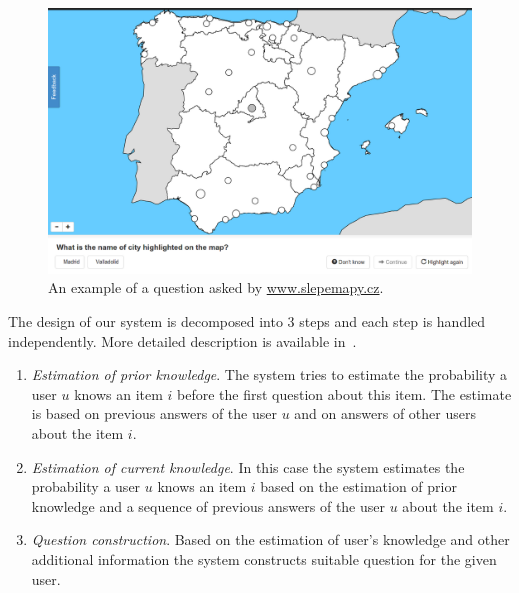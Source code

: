\documentclass[table,color]{fithesis3/fithesis3}
\begin{document}
\begin{figure}[h]
	\begin{center}
		\includegraphics[width=\textwidth]{figure/slepemapy_spain_highlighted}
		\caption{An example of a question asked by \url{www.slepemapy.cz}.}
		\label{figure:example_question}
	\end{center}
\end{figure}

The design of our system is decomposed into 3 steps and each step is handled
independently. More detailed description is available
in~\cite{papousek2014adaptive, papousek2015impact}.

\begin{enumerate}
	\item \emph{Estimation of prior knowledge}. The system tries to estimate the
		probability a user $u$ knows an item $i$ before the first question
		about this item. The estimate is based on previous answers of the user $u$
		and on answers of other users about the item $i$.
	\item \emph{Estimation of current knowledge}. In this case the system
		estimates the probability a user $u$ knows an item $i$ based on the
		estimation of prior knowledge and a sequence of previous answers of the
		user $u$ about the item $i$.
	\item \emph{Question construction}. Based on the estimation of user's
		knowledge and other additional information the system constructs suitable
		question for the given user.
\end{enumerate}
\end{document}
